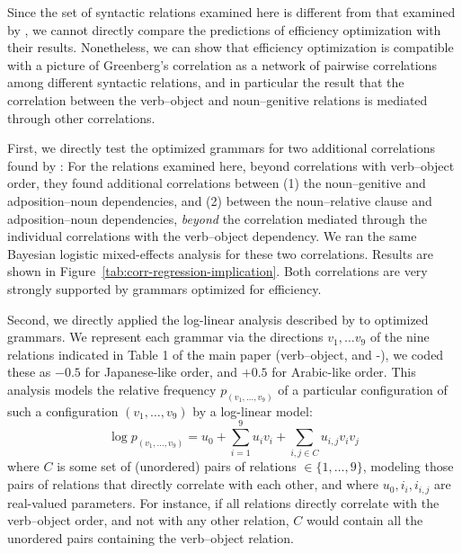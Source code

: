 \documentclass[10pt,twoside,lineno]{article}
\begin{document}
Since the set of syntactic relations examined here is different from that examined by \citet{justeson1990explanation}, we cannot directly compare the predictions of efficiency optimization with their results.
Nonetheless, we can show that efficiency optimization is compatible with a picture of Greenberg's correlation as a network of pairwise correlations among different syntactic relations, and in particular the result that the correlation between the verb--object and noun--genitive relations is mediated through other correlations.

First, we directly test the optimized grammars for two additional correlations found by \citet{justeson1990explanation}:
For the relations examined here, beyond correlations with verb--object order, they found additional correlations between (1) the noun--genitive and adposition--noun dependencies, and (2) between the noun--relative clause and adposition--noun dependencies, \emph{beyond} the correlation mediated through the individual correlations with the verb--object dependency.
We ran the same Bayesian logistic mixed-effects analysis for these two correlations.
Results are shown in Figure~\ref{tab:corr-regression-implication}.
Both correlations are very strongly supported by grammars optimized for efficiency.

Second, we directly applied the log-linear analysis described by \citet{justeson1990explanation} to optimized grammars.
We represent each grammar via the directions $v_1, \dots v_9$ of the nine relations indicated in Table 1 of the main paper (verb--object, and -), we coded these as $-0.5$ for Japanese-like order, and $+0.5$ for Arabic-like order.
This analysis models the relative frequency $p_{(v_1, \dots, v_9)}$ of a particular configuration of such a configuration $(v_1, \dots, v_9)$ by a log-linear model:
\begin{equation}
	\log p_{(v_1, \dots, v_9)} = u_0 + \sum_{i=1}^9 u_i v_i + \sum_{i, j \in C} u_{i,j} v_{i} v_{j}
\end{equation}
where $C$ is some set of (unordered) pairs of relations $\in \{1, \dots, 9\}$, modeling those pairs of relations that directly correlate with each other, and where $u_0, i_i, i_{i,j}$ are real-valued parameters.
For instance, if all relations directly correlate with the verb--object order, and not with any other relation, $C$ would contain all the unordered pairs containing the verb--object relation.
\end{document}
